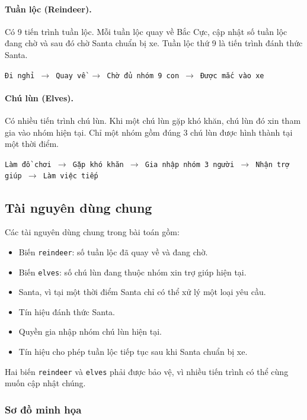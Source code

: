 \paragraph{Tuần lộc (Reindeer).}
Có 9 tiến trình tuần lộc. Mỗi tuần lộc quay về Bắc Cực, cập nhật số
tuần lộc đang chờ và sau đó chờ Santa chuẩn bị xe. Tuần lộc thứ 9 là
tiến trình đánh thức Santa.

\begin{center}
\texttt{Đi nghỉ $\rightarrow$ Quay về $\rightarrow$ Chờ đủ nhóm 9 con
$\rightarrow$ Được mắc vào xe}
\end{center}

\paragraph{Chú lùn (Elves).}
Có nhiều tiến trình chú lùn. Khi một chú lùn gặp khó khăn, chú lùn đó
xin tham gia vào nhóm hiện tại. Chỉ một nhóm gồm đúng 3 chú lùn được
hình thành tại một thời điểm.

\begin{center}
\texttt{Làm đồ chơi $\rightarrow$ Gặp khó khăn $\rightarrow$ Gia nhập nhóm
3 người $\rightarrow$ Nhận trợ giúp $\rightarrow$ Làm việc tiếp}
\end{center}

\subsection{Tài nguyên dùng chung}

Các tài nguyên dùng chung trong bài toán gồm:

\begin{itemize}
\item Biến \texttt{reindeer}: số tuần lộc đã quay về và đang chờ.
\item Biến \texttt{elves}: số chú lùn đang thuộc nhóm xin trợ giúp
hiện tại.
\item Santa, vì tại một thời điểm Santa chỉ có thể xử lý một loại
yêu cầu.
\item Tín hiệu đánh thức Santa.
\item Quyền gia nhập nhóm chú lùn hiện tại.
\item Tín hiệu cho phép tuần lộc tiếp tục sau khi Santa chuẩn bị xe.
\end{itemize}

Hai biến \texttt{reindeer} và \texttt{elves} phải được bảo vệ, vì nhiều
tiến trình có thể cùng muốn cập nhật chúng.

\subsubsection*{Sơ đồ minh họa}

